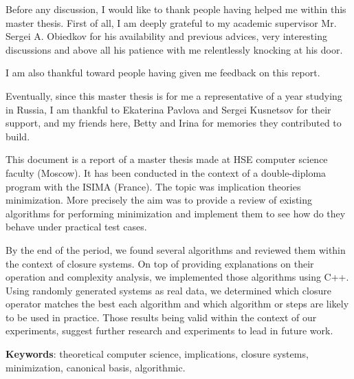 \documentclass[a4paper]{report}
\begin{document}
	

	



Before any discussion, I would like to thank people having helped me within this master thesis. First of all, I am deeply grateful to my academic supervisor Mr. Sergei A. Obiedkov for his availability and previous advices, very interesting discussions and above all his patience with me relentlessly knocking at his door.

I am also thankful toward people having given me feedback on this report.

Eventually, since this master thesis is for me a representative of a year studying in Russia, I am thankful to Ekaterina Pavlova and Sergei Kusnetsov for their support, and my friends here, Betty and Irina for memories they contributed to build.

\newpage
\listoffigures
\newpage

\newpage
\listoftables
\newpage

\newpage
\listofalgorithms
\newpage



This document is a report of a master thesis made at HSE computer science faculty (Moscow). It has been conducted in the context of a double-diploma program with the ISIMA (France). The topic was implication theories minimization. More precisely the aim was to provide a review of existing algorithms for performing minimization and implement them to see how do
they behave under practical test cases.

\vspace{1.2em}

By the end of the period, we found several algorithms and reviewed them within the context of closure systems. On top of providing explanations on their operation and complexity analysis, we implemented those algorithms using C++.
Using randomly generated systems as real data, we determined which closure operator matches the best each algorithm and which algorithm or steps are likely to be used in practice. Those results being valid within the context
of our experiments, suggest further research and experiments to lead in future work.

\vspace{1.2em}

\textbf{Keywords}: theoretical computer science, implications, closure systems, minimization, canonical basis, algorithmic.
\end{document}
